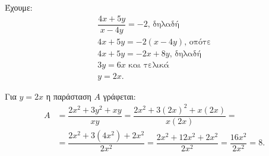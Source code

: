 
\begin{alist}
\item Έχουμε:
\begin{gather*}
\dfrac{4x + 5y}{x - 4y} = -2\text{, δηλαδή} \\
4x + 5y = -2(x - 4y)\text{, οπότε} \\
4x + 5y = -2x + 8y\text{, δηλαδή} \\
3y = 6x\text{ και τελικά} \\
y = 2x.
\end{gather*}

\item Για $y = 2x$ η παράσταση $A$ γράφεται:
\begin{align*}
    A &= \dfrac{2x^2 + 3y^2 + xy}{xy} = \dfrac{2x^2 + 3(2x)^2 + x(2x)}{x(2x)} =\\&= \dfrac{2x^2 + 3(4x^2) + 2x^2}{2x^2} = \dfrac{2x^2 + 12x^2 + 2x^2}{2x^2} = \dfrac{16x^2}{2x^2} = 8.
\end{align*}\end{alist}

